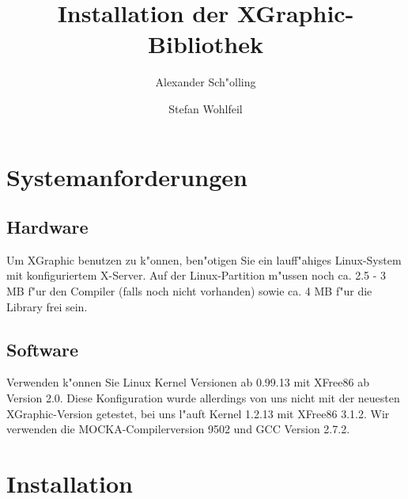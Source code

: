\pagestyle{headings}

\title{Installation der XGraphic-Bibliothek}
\author{Alexander Sch"olling \and
Stefan Wohlfeil}


\maketitle

\newcommand{\prochead}[1]{{{#1}\index{#1}}}
\newcommand{\syntax}[1]{\item[Syntax:] {\tt #1}}
\newcommand{\param}[1]{\item[Parameter:] {#1}}
\newcommand{\func}[1]{\item[Funktionalit"at:] {#1}}
\newenvironment{commanddesc}{%
	\begin{description}
}{%
	\end{description}
}


\section{Systemanforderungen}

\subsection{Hardware}
Um XGraphic benutzen zu k"onnen, ben"otigen Sie ein lauff"ahiges
Linux-System mit konfiguriertem X-Server. Auf der Linux-Partition
m"ussen noch ca. 2.5 - 3 MB f"ur den Compiler (falls noch nicht
vorhanden) sowie ca. 4 MB f"ur die Library frei sein.

\subsection{Software}
Verwenden k"onnen Sie Linux Kernel Versionen ab 0.99.13 mit XFree86
ab Version 2.0. Diese Konfiguration wurde allerdings von uns nicht
mit der neuesten XGraphic-Version getestet, bei uns l"auft Kernel
1.2.13 mit XFree86 3.1.2. Wir verwenden die MOCKA-Compilerversion 9502
und GCC Version 2.7.2.


\section{Installation}

